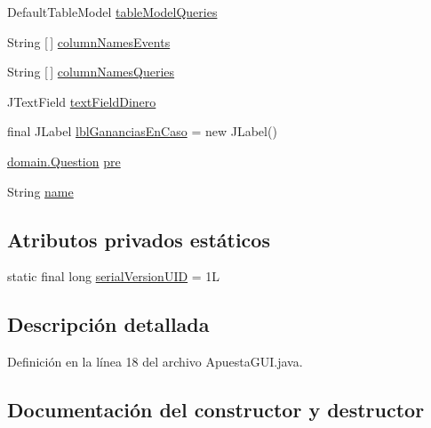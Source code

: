\begin{DoxyCompactItemize}
Default\+Table\+Model \mbox{\hyperlink{classgui_1_1ApuestaGUI_afaf67870f0f157f4f406c278553d5fa5}{table\+Model\+Queries}}
\item 
String \mbox{[}$\,$\mbox{]} \mbox{\hyperlink{classgui_1_1ApuestaGUI_a6f33c3546a42f114f4580d50a7294790}{column\+Names\+Events}}
\item 
String \mbox{[}$\,$\mbox{]} \mbox{\hyperlink{classgui_1_1ApuestaGUI_ac27835f6997f845bbb80a766939a01f5}{column\+Names\+Queries}}
\item 
J\+Text\+Field \mbox{\hyperlink{classgui_1_1ApuestaGUI_abf62f989314e3bf1f528896cd17c247e}{text\+Field\+Dinero}}
\item 
final J\+Label \mbox{\hyperlink{classgui_1_1ApuestaGUI_a961d928173986250ac0aa7b8f8f2c138}{lbl\+Ganancias\+En\+Caso}} = new J\+Label()
\item 
\mbox{\hyperlink{classdomain_1_1Question}{domain.\+Question}} \mbox{\hyperlink{classgui_1_1ApuestaGUI_a28da529f5967588873927cc509a27b3a}{pre}}
\item 
String \mbox{\hyperlink{classgui_1_1ApuestaGUI_a520311ac991feb78793eb7a4116739b6}{name}}
\end{DoxyCompactItemize}
\subsection*{Atributos privados estáticos}
\begin{DoxyCompactItemize}
\item 
static final long \mbox{\hyperlink{classgui_1_1ApuestaGUI_abebe7eec2f66fa264e15aa3222a8e19c}{serial\+Version\+U\+ID}} = 1L
\end{DoxyCompactItemize}


\subsection{Descripción detallada}


Definición en la línea 18 del archivo Apuesta\+G\+U\+I.\+java.



\subsection{Documentación del constructor y destructor}
\mbox{\label{classgui_1_1ApuestaGUI_a2ff2375bd3ced7a413fe0b32abe41ab7}} 
